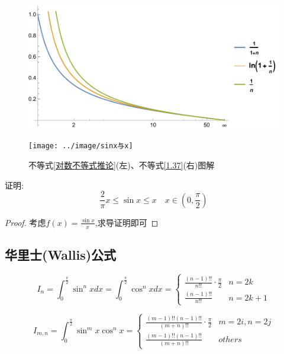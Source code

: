 \begin{figure}[htbp]
    \centering
    \subfloat
    {
        \begin{minipage}[t]{0.49\textwidth}
            \centering
            \includegraphics[width=\textwidth]{../image/对数不等式推论}
        \end{minipage}
    }
    \subfloat
    {
        \begin{minipage}[t]{0.49\textwidth}
            \centering
            \texttt{[image: ../image/sinx与x]}
        \end{minipage}
    }
    \vspace{6pt}
    \caption{不等式\ref{对数不等式推论}(左)、不等式\ref{1.37}(右)图解}
\end{figure}

\begin{example}
    证明:\begin{equation}
        \frac{2}{\pi}x \le \sin x \le x \quad x\in (0,\frac{\pi}{2}) \label{1.37}
    \end{equation}
\end{example}

\begin{proof}
    考虑$f(x)=\frac{\sin x}{x}$,求导证明即可
\end{proof}

\subsection{华里士(Wallis)公式}
\begin{theorem}[Wallis公式]
    \begin{equation}
        I_n=\int_{0}^{\frac{\pi}{2}} \sin^n xdx=\int_{0}^{\frac{\pi}{2}} \cos^n xdx=
        \begin{cases}
        \frac{(n-1)!!}{n!!} \cdot \frac{\pi}{2}& n=2k\\ 
        \frac{(n-1)!!}{n!!}& n=2k+1
        \end{cases}
    \end{equation}

    \begin{equation}
        I_{m,n}=\int_{0}^{\frac{\pi}{2}}\sin^m x \cos^n x=
    \begin{cases}
        \frac{(m-1)!!(n-1)!!}{(m+n)!!}\cdot \frac{\pi}{2} & m=2i,n=2j\\ 
        \frac{(m-1)!!(n-1)!!}{(m+n)!!}& others
    \end{cases}
    \end{equation}
\end{theorem}

